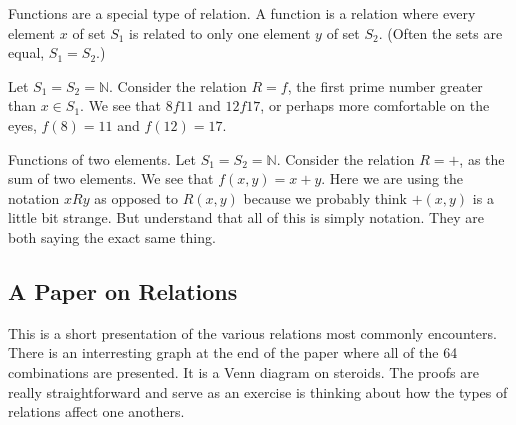 Functions are a special type of relation.  A function is a relation where every element $x$ of set $S_1$ is related to only one element $y$ of set $S_2$.  (Often the sets are equal, $S_1=S_2$.) 
\begin{example} Let $S_1=S_2 = \mathbb{N}$.  Consider the relation $R = f$, the first prime number greater than $x\in S_1$.  We see that $8f11$ and $12f17$, or perhaps more comfortable on the eyes, $f(8)=11$  and $f(12) = 17$.  
\end{example}

\begin{example} Functions of two elements.  Let $S_1=S_2 = \mathbb{N}$.  Consider the relation $R = +$, as the sum of two elements.  We see that $f(x,y)=x+y$.  Here we are  using the notation $xRy$ as opposed to $R(x,y)$ because we probably think  $+(x,y)$ is a little bit strange.  But understand that all of this is simply notation.  They are both saying the exact same thing.  
\end{example}

\newpage
\subsection{A Paper on Relations}
This is a short presentation of the various relations most commonly encounters.  There is an interresting graph at the end of the paper where all of the 64 combinations are presented.  It is  a Venn diagram on steroids.  The proofs are really straightforward and serve as an exercise is thinking about how the types of relations affect one anothers.\cite{slonneger1977}
\fancyfoot[CE CO]{}
\fancyfoot[RE,RO]{}
\fancyfoot[LE,LO]{}
